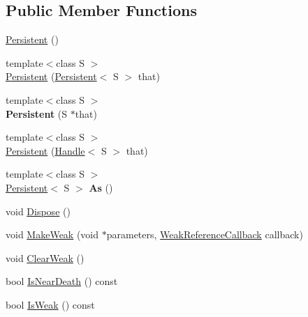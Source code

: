 \subsection*{Public Member Functions}
\begin{DoxyCompactItemize}
\item 
\hyperlink{classv8_1_1_persistent_aff7516636baaf209885220f7cff34463}{Persistent} ()
\item 
{\footnotesize template$<$class S $>$ }\\\hyperlink{classv8_1_1_persistent_aea24de4ad0e6cd8e102411e11fbc3948}{Persistent} (\hyperlink{classv8_1_1_persistent}{Persistent}$<$ S $>$ that)
\item 
\hypertarget{classv8_1_1_persistent_a8050e41b31d6fbdf967957d6f5db2205}{}{\footnotesize template$<$class S $>$ }\\{\bfseries Persistent} (S $\ast$that)\label{classv8_1_1_persistent_a8050e41b31d6fbdf967957d6f5db2205}

\item 
{\footnotesize template$<$class S $>$ }\\\hyperlink{classv8_1_1_persistent_a89b49f1b1903a2d625d5c3100238276e}{Persistent} (\hyperlink{classv8_1_1_handle}{Handle}$<$ S $>$ that)
\item 
\hypertarget{classv8_1_1_persistent_a5d30266380d9a759050aee25fbcc3c88}{}{\footnotesize template$<$class S $>$ }\\\hyperlink{classv8_1_1_persistent}{Persistent}$<$ S $>$ {\bfseries As} ()\label{classv8_1_1_persistent_a5d30266380d9a759050aee25fbcc3c88}

\item 
void \hyperlink{classv8_1_1_persistent_a33e53191844272ba0f2da4f55fc12297}{Dispose} ()
\item 
void \hyperlink{classv8_1_1_persistent_ab04609812113450bece2640ad0b27658}{Make\+Weak} (void $\ast$parameters, \hyperlink{namespacev8_a4d5db775dbc002b23f1b55ec7ce80ea5}{Weak\+Reference\+Callback} callback)
\item 
void \hyperlink{classv8_1_1_persistent_a30806c1125371c269a02ec03d47c69ab}{Clear\+Weak} ()
\item 
bool \hyperlink{classv8_1_1_persistent_a1f60b982c5e734df7e4fe22ccd5b62cf}{Is\+Near\+Death} () const 
\item 
bool \hyperlink{classv8_1_1_persistent_aa636a55b81eee222f86866dd5ae8c06f}{Is\+Weak} () const 
\end{DoxyCompactItemize}
